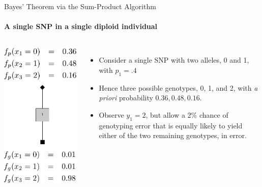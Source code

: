 \documentclass[letter,graphicx]{beamer}
\begin{document}
\begin{frame}{Bayes' Theorem via the Sum-Product Algorithm}
\framesubtitle{A single SNP in a single diploid individual}

\begin{columns}
\includegraphics[height = 0.8\textheight]{./images/single-node-sum-product-a.pdf}
\begin{itemize}
\item Consider a single SNP with two alleles, 0 and 1, with $p_1 = .4$\\
\item Hence three possible genotypes, 0, 1, and 2, with {\em a priori} 
probability $0.36, 0.48, 0.16$.
\item Observe $y_1 = 2$, but allow a 2\% chance of genotyping error that is equally likely to yield either of the two remaining genotypes, in error.
\end{itemize}
\end{columns}
\end{frame}
\end{document}
